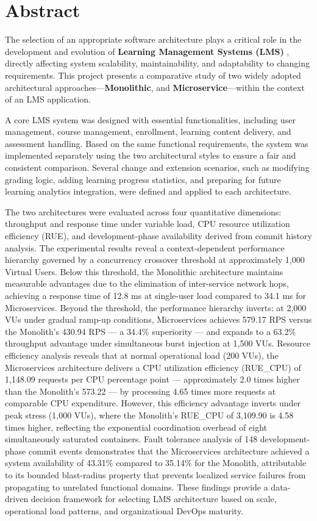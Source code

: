 \chapter{Abstract}

The selection of an appropriate software architecture plays a critical role in the development and 
evolution of \textbf{Learning Management Systems (LMS)} , directly affecting system scalability, maintainability, 
and adaptability to changing requirements. This project presents a comparative study of two widely 
adopted architectural approaches—\textbf{Monolithic},  and \textbf{Microservice}—within the context of 
an LMS application.

A core LMS system was designed with essential functionalities, including user management, course management,
enrollment, learning content delivery, and assessment handling. Based on the same functional requirements, 
the system was implemented separately using the two architectural styles to ensure a fair and consistent 
comparison. Several change and extension scenarios, such as modifying grading logic, adding learning 
progress statistics, and preparing for future learning analytics integration, were defined and applied
to each architecture.

The two architectures were evaluated across four quantitative dimensions: throughput and response time under 
variable load, CPU resource utilization efficiency (RUE), and development-phase availability derived from 
commit history analysis. The experimental results reveal a context-dependent performance hierarchy governed 
by a concurrency crossover threshold at approximately 1,000 Virtual Users. Below this threshold, 
the Monolithic architecture maintains measurable advantages due to the elimination of inter-service 
network hops, achieving a response time of 12.8 ms at single-user load compared to 34.1 ms for Microservices. 
Beyond the threshold, the performance hierarchy inverts: at 2,000 VUs under gradual ramp-up conditions, 
Microservices achieves 579.17 RPS versus the Monolith's 430.94 RPS — a 34.4\% superiority — and 
expands to a 63.2\% throughput advantage under simultaneous burst injection at 1,500 VUs. 
Resource efficiency analysis reveals that at normal operational load (200 VUs), the 
Microservices architecture delivers a CPU utilization efficiency (RUE\_CPU) of 1,148.09 
requests per CPU percentage point — approximately 2.0 times higher than the Monolith's 
573.22 — by processing 4.65 times more requests at comparable CPU expenditure. However, 
this efficiency advantage inverts under peak stress (1,000 VUs), where the Monolith's RUE\_CPU 
of 3,109.90 is 4.58 times higher, reflecting the exponential coordination overhead of eight 
simultaneously saturated containers. Fault tolerance analysis of 148 development-phase commit 
events demonstrates that the Microservices architecture achieved a system availability of 43.31\% 
compared to 35.14\% for the Monolith, attributable to its bounded blast-radius property that 
prevents localized service failures from propagating to unrelated functional domains. 
These findings provide a data-driven decision framework for selecting LMS architecture 
based on scale, operational load patterns, and organizational DevOps maturity.